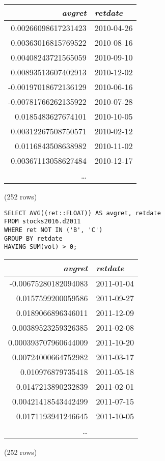 \documentclass[]{article}
\begin{document}
\begin{center}
\begin{tabular}{r | l}
\textit{avgret} & \textit{retdate} \\
\hline
0.00266098617231423 & 2010-04-26 \\
0.00363016815769522 & 2010-08-16 \\
0.00408243721565059 & 2010-09-10 \\
0.00893513607402913 & 2010-12-02 \\
-0.00197018672136129 & 2010-06-16 \\
-0.00781766262135922 & 2010-07-28 \\
0.0185483627674101 & 2010-10-05 \\
0.00312267508750571 & 2010-02-12 \\
0.0116843508638982 & 2010-11-02 \\
0.00367113058627484 & 2010-12-17 \\
\ldots\\
\end{tabular}

\noindent (252 rows) \\
\end{center}

\color{blue}
\begin{verbatim}
SELECT AVG((ret::FLOAT)) AS avgret, retdate
FROM stocks2016.d2011
WHERE ret NOT IN ('B', 'C')
GROUP BY retdate
HAVING SUM(vol) > 0;
\end{verbatim}
\color{black}

\begin{center}
\begin{tabular}{r | l}
\textit{avgret} & \textit{retdate} \\
\hline
-0.00675280182094083 & 2011-01-04 \\
0.0157599200059586 & 2011-09-27 \\
0.0189066896346011 & 2011-12-09 \\
0.00389523259326385 & 2011-02-08 \\
0.000393707960644009 & 2011-10-20 \\
0.00724000664752982 & 2011-03-17 \\
0.010976879735418 & 2011-05-18 \\
0.0147213890232839 & 2011-02-01 \\
0.00421418543442499 & 2011-07-15 \\
0.0171193941246645 & 2011-10-05 \\
\ldots\\
\end{tabular}

\noindent (252 rows) \\
\end{center}
\end{document}
